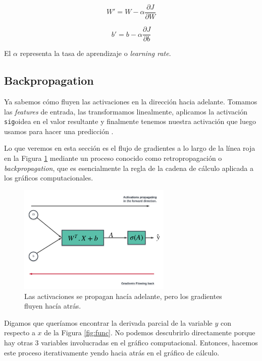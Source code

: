 \documentclass[a4paper,12pt]{article}
\begin{document}
\begin{equation}
W' = W - \alpha \frac{\partial J}{\partial W}
\end{equation}

\begin{equation}
b' = b - \alpha \frac{\partial J}{\partial b}
\end{equation}

El $\alpha$ representa la tasa de aprendizaje o  \textit{learning rate}.

\subsection{Backpropagation}

Ya sabemos cómo fluyen las activaciones en la dirección hacia adelante. Tomamos las \textit{features} de entrada, las transformamos linealmente, aplicamos la activación \texttt{sig}oidea en el valor resultante y finalmente tenemos nuestra activación que luego usamos para hacer una predicción \citep{sgd}.

Lo que veremos en esta sección es el flujo de gradientes a lo largo de la línea roja en la Figura \ref{fig:back} mediante un proceso conocido como retropropagación o \textit{backpropagation}, que es esencialmente la regla de la cadena de cálculo aplicada a los gráficos computacionales.

\begin{figure}[H]
	\begin{center}				
	\includegraphics[width=0.65\textwidth]{024.png}
  	\caption{Las activaciones se propagan hacía adelante, pero los gradientes fluyen hacía atrás.}
  	\label{fig:back}
  	\end{center}
\end{figure}

Digamos que queríamos encontrar la derivada parcial de la variable $y$ con respecto a $x$ de la Figura \ref{fig:func}. No podemos descubrirlo directamente porque hay otras 3 variables involucradas en el gráfico computacional. Entonces, hacemos este proceso iterativamente yendo hacia atrás en el gráfico de cálculo.
\end{document}
